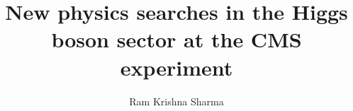 \documentclass[11pt,a4paper]{postdoc_temp}
\author{Ram Krishna Sharma}
\title{New physics searches in the Higgs boson sector at the CMS experiment}
\begin{document}
\listoftodos

% 

















\appendix


\end{document}
